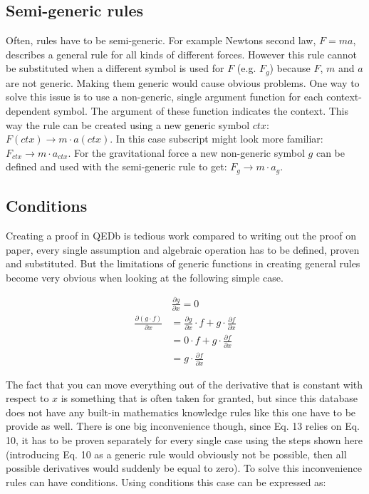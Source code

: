 \documentclass{article}
\begin{document}
\subsection{Semi-generic rules}
Often, rules have to be semi-generic. For example Newtons second law, $F=ma$, describes a general rule for all kinds of different forces. However this rule cannot be substituted when a different symbol is used for $F$ (e.g. $F_g$) because $F$, $m$ and $a$ are not generic. Making them generic would cause obvious problems. One way to solve this issue is to use a non-generic, single argument function for each context-dependent symbol. The argument of these function indicates the context. This way the rule can be created using a new generic symbol $ctx$: $F(ctx)\rightarrow m\cdot a(ctx)$. In this case subscript might look more familiar: $F_{ctx}\rightarrow m\cdot a_{ctx}$. For the gravitational force a new non-generic symbol $g$ can be defined and used with the semi-generic rule to get: $F_g\rightarrow m\cdot a_g$. 

\subsection{Conditions}
\label{section:conditions}
Creating a proof in QEDb is tedious work compared to writing out the proof on paper, every single assumption and algebraic operation has to be defined, proven and substituted. But the limitations of generic functions in creating general rules become very obvious when looking at the following simple case.

\begin{align} \frac{\partial g}{\partial x}=0
\end{align}
\begin{align}
\frac{\partial (g\cdot f)}{\partial x}
&= \frac{\partial g}{\partial x}\cdot f+g\cdot\frac{\partial f}{\partial x}\\
&= 0\cdot f+g\cdot\frac{\partial f}{\partial x}\\
&= g\cdot\frac{\partial f}{\partial x}
\end{align}

\newpage

The fact that you can move everything out of the derivative that is constant with respect to $x$ is something that is often taken for granted, but since this database does not have any built-in mathematics knowledge rules like this one have to be provide as well. There is one big inconvenience though, since Eq. 13 relies on Eq. 10, it has to be proven separately for every single case using the steps shown here (introducing Eq. 10 as a generic rule would obviously not be possible, then all possible derivatives would suddenly be equal to zero). To solve this inconvenience rules can have conditions. Using conditions this case can be expressed as:
\end{document}
